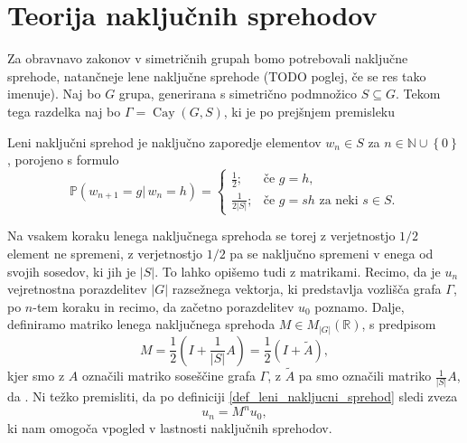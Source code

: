 \documentclass[mat1, tisk]{fmfdelo}
\numberwithin{equation}{section}  %
\begin{document}
\section{Teorija naključnih sprehodov}

Za obravnavo zakonov v simetričnih grupah bomo potrebovali naključne sprehode, natančneje lene naključne sprehode (TODO poglej, če se res tako imenuje).
Naj bo $G$ grupa, generirana s simetrično podmnožico $S \subseteq G$. Tekom tega razdelka naj bo $\Gamma = \operatorname{Cay}(G, S)$, ki je po prejšnjem premisleku 



\begin{definicija}
\label{def_leni_nakljucni_sprehod}
    Leni naključni sprehod je naključno zaporedje elementov $w_n \in S$ za $n \in \mathbb{N} \cup \left\{ 0\right\} $, porojeno s formulo \begin{equation*}
        \mathbb{P}(w_{n+1} = g   \vert \,  w_n = h) = \begin{cases}
            \frac{1}{2}; & \text{če }  g = h, \\
            \frac{1}{2 \lvert S \rvert }; & \text{če } g = sh \text{ za neki } s \in S.
        \end{cases}
    \end{equation*}  
\end{definicija}
Na vsakem koraku lenega naključnega sprehoda se torej z verjetnostjo $1 / 2$ element ne spremeni, z verjetnostjo $1 / 2$ pa se naključno spremeni v enega od svojih sosedov, ki jih je $\lvert S \rvert$.
To lahko opišemo tudi z matrikami. Recimo, da je $u_n$ vejretnostna porazdelitev $\lvert G \rvert$ razsežnega vektorja, ki predstavlja vozlišča grafa $\Gamma$, po $n$-tem koraku in recimo, da začetno porazdelitev $u_0$ poznamo. Dalje, definiramo matriko lenega naključnega sprehoda $M \in M_{\lvert G \rvert }(\mathbb{R})$, s predpisom    
\begin{equation*}
M = \frac{1}{2} \left(I + \frac{1}{\lvert S \rvert } A \right) = \frac{1}{2} (I + \tilde{A}),
\end{equation*}  
kjer smo z $A$ označili matriko soseščine grafa $\Gamma$, z $\tilde{A}$ pa smo označili matriko $\frac{1}{\lvert S \rvert} A$, da . Ni težko premisliti, da po definiciji \ref{def_leni_nakljucni_sprehod} sledi zveza 
\begin{equation*}
u_n = M^{n} u_0,
\end{equation*}  
ki nam omogoča vpogled v lastnosti naključnih sprehodov. 
\end{document}
